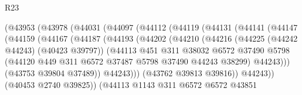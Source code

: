 \begin{lexlean}{R23}
\begin{coremodule}
                          (@43953
                            (@43978
                              (@44031
                                (@44097
                                  (@44112
                                    (@44119
                                      (@44131
                                        (@44141
                                          (@44147
                                            (@44159
                                              (@44167
                                                (@44187
                                                  (@44193
                                                    (@44202
                                                      (@44210
                                                        (@44216
                                                          (@44225 (@44242 @44243) (@40423 @39797))
                                                          (@44113
                                                            @451
                                                            @311
                                                            @38032
                                                            @6572
                                                            @37490
                                                            @5798
                                                            (@44120
                                                              @449
                                                              @311
                                                              @6572
                                                              @37487
                                                              @5798
                                                              @37490
                                                              @44243
                                                              @38299)
                                                            @44243)))
                                                      (@43753 @39804 @37489))
                                                    @44243)))
                                              (@43762 @39813 @39816))
                                            @44243))
                                        (@40453 @2740 @39825))
                                      (@44113
                                        @1143
                                        @311
                                        @6572
                                        @6572
                                        @43851

\end{coremodule}
\end{lexlean}
